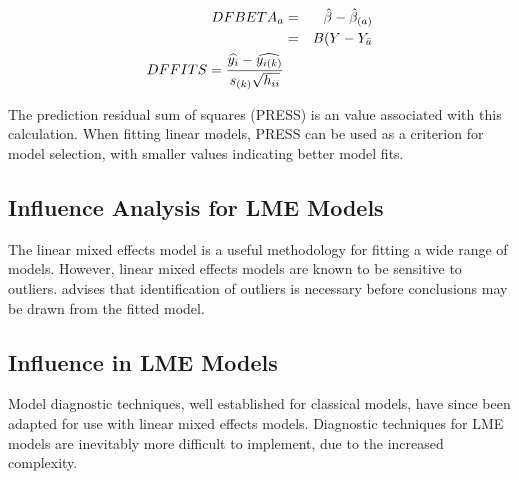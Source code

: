 \documentclass[00-MASTER.tex]{subfiles}
\begin{document}
		\begin{eqnarray}
		DFBETA_{a} &=& \hat{\beta} - \hat{\beta}_{(a)} \\
		&=& B(Y-Y_{\bar{a}}
		\\ DFFITS = {\widehat{y_i} -
		\widehat{y_{i(k)}} \over s_{(k)} \sqrt{h_{ii}}} 
	\end{eqnarray}
	
	The prediction residual sum of squares (PRESS) is an value associated with this calculation. When fitting linear models, PRESS can be used as a criterion for model selection, with smaller values indicating better model fits.
%
%	
%	
	
	\subsection{Influence Analysis for LME Models} %
	The linear mixed effects model is a useful methodology for fitting a wide range of models. However, linear mixed effects models are known to be sensitive to outliers. \citet{CPJ} advises that identification of outliers is necessary before conclusions may be drawn from the fitted model.
\subsection{Influence in LME Models}
	
	Model diagnostic techniques, well established for classical models, have since been adapted for use with linear mixed effects models. Diagnostic techniques for LME models are inevitably more difficult to implement, due to the increased complexity.
	
	
\end{document}
